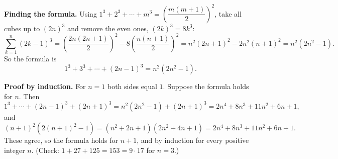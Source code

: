 \textbf{Finding the formula.} Using $1^3+2^3+\cdots+m^3=\left(\dfrac{m(m+1)}{2}\right)^2$, take all cubes up to $(2n)^3$ and remove the even ones, $(2k)^3=8k^3$:
\[\sum_{k=1}^{n}(2k-1)^3=\left(\dfrac{2n(2n+1)}{2}\right)^2-8\left(\dfrac{n(n+1)}{2}\right)^2=n^2(2n+1)^2-2n^2(n+1)^2=n^2\left(2n^2-1\right).\]
So the formula is
\[1^3+3^3+\cdots+(2n-1)^3=\boxed{n^2\left(2n^2-1\right)}.\]

\textbf{Proof by induction.} For $n=1$ both sides equal $1$. Suppose the formula holds for $n$. Then
\[1^3+\cdots+(2n-1)^3+(2n+1)^3=n^2\left(2n^2-1\right)+(2n+1)^3=2n^4+8n^3+11n^2+6n+1,\]
and
\[(n+1)^2\left(2(n+1)^2-1\right)=\left(n^2+2n+1\right)\left(2n^2+4n+1\right)=2n^4+8n^3+11n^2+6n+1 .\]
These agree, so the formula holds for $n+1$, and by induction for every positive integer $n$. (Check: $1+27+125=153=9\cdot17$ for $n=3$.)
